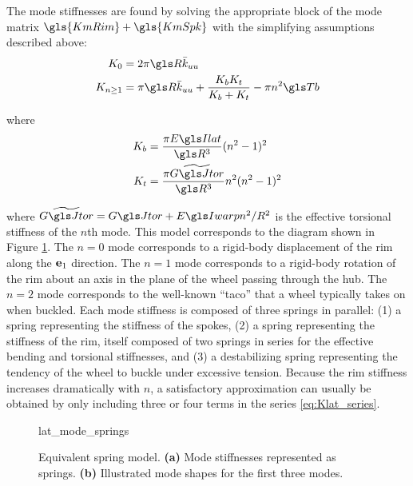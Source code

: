 \documentclass[\rootdir/thesis.tex]{subfiles}
\begin{document}
The mode stiffnesses are found by solving the appropriate block of the mode matrix $\gls{KmRim} + \gls{KmSpk}$ with the simplifying assumptions described above:
\begin{subequations}\label{eq:Kn}
\begin{align}
K_0 &= 2\pi\R\kuu \label{eq:Kn_0}\\
K_{n\geq1} & = \pi\R\kuu + \frac{\Kbend \Ktors}{\Kbend + \Ktors} - \pi n^2 \Tb \label{eq:Kn_n}
\end{align}
\end{subequations}

where
\begin{align*}
\Kbend &= \frac{\pi \EIl}{\R^3} (n^2-1)^2\\
\Ktors &= \frac{\pi \widetilde{\GJ}}{\R^3}n^2(n^2-1)^2
\end{align*}

where $\widetilde{\GJ} = \GJ + \EIw n^2/R^2$ is the effective torsional stiffness of the $n$th mode. This model corresponds to the diagram shown in Figure \ref{fig:lat_mode_springs}. The $n=0$ mode corresponds to a rigid-body displacement of the rim along the $\mathbf{e}_1$ direction. The $n=1$ mode corresponds to a rigid-body rotation of the rim about an axis in the plane of the wheel passing through the hub. The $n=2$ mode corresponds to the well-known ``taco'' that a wheel typically takes on when buckled. Each mode stiffness is composed of three springs in parallel: (1) a spring representing the stiffness of the spokes, (2) a spring representing the stiffness of the rim, itself composed of two springs in series for the effective bending and torsional stiffnesses, and (3) a destabilizing spring representing the tendency of the wheel to buckle under excessive tension. Because the rim stiffness increases dramatically with $n$, a satisfactory approximation can usually be obtained by only including three or four terms in the series \eqref{eq:Klat_series}.

\begin{figure}[h]
\centering
{lat_mode_springs}
\caption{Equivalent spring model. \textbf{(a)} Mode stiffnesses represented as springs. \textbf{(b)} Illustrated mode shapes for the first three modes.}
\label{fig:lat_mode_springs}
\end{figure}
\end{document}
